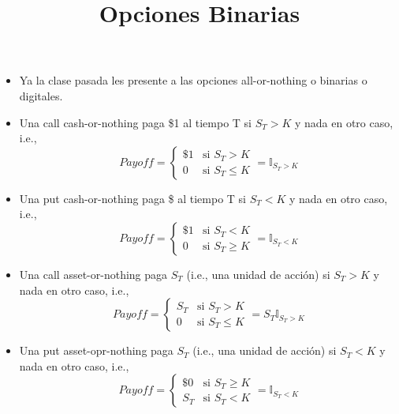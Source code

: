 \documentclass[12pts]{extarticle}
\author{}
\date{}
\title{Opciones Binarias}
\begin{document}
\maketitle
\begin{itemize}
\item Ya la clase pasada les presente a las opciones all-or-nothing o binarias o digitales.
\item Una call cash-or-nothing paga \$1 al tiempo T si $S_T>K$ y nada en otro caso, i.e.,
$$Payoff= \begin{cases} \$ 1 & \mbox{si } S_T>K  \\
                                            0 & \mbox{si } S_T \leq K \end{cases} =\mathbb{I}_{S_T>K}$$ 

\item Una put cash-or-nothing paga \$ al tiempo T si $S_T<K$ y nada en otro caso, i.e., 
$$Payoff= \begin{cases} \$ 1 & \mbox{si } S_T< K  \\
                                            0 & \mbox{si } S_T \geq K \end{cases} =\mathbb{I}_{S_T<K}$$ 
\item Una call asset-or-nothing paga $S_T$ (i.e., una unidad de acción) si $S_T>K$ y nada en otro caso, i.e., 
$$Payoff= \begin{cases} S_T & \mbox{si } S_T>K  \\
                                            0 & \mbox{si } S_T \leq K \end{cases} =S_T \mathbb{I}_{S_T>K}$$ 
\item Una put asset-opr-nothing paga $S_T$ (i.e., una unidad de acción) si $S_T<K$ y nada en otro caso, i.e., 
$$Payoff= \begin{cases} \$ 0 & \mbox{si } S_T\geq K  \\
                                            S_T & \mbox{si } S_T < K \end{cases} =\mathbb{I}_{S_T<K}$$ 

\end{itemize}
\newpage 
\newpage
\end{document}
